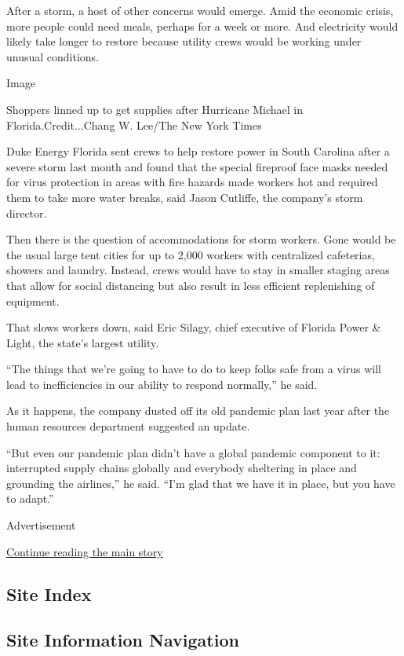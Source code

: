 After a storm, a host of other concerns would emerge. Amid the economic
crisis, more people could need meals, perhaps for a week or more. And
electricity would likely take longer to restore because utility crews
would be working under unusual conditions.

Image

Shoppers linned up to get supplies after Hurricane Michael in
Florida.Credit...Chang W. Lee/The New York Times

Duke Energy Florida sent crews to help restore power in South Carolina
after a severe storm last month and found that the special fireproof
face masks needed for virus protection in areas with fire hazards made
workers hot and required them to take more water breaks, said Jason
Cutliffe, the company's storm director.

Then there is the question of accommodations for storm workers. Gone
would be the usual large tent cities for up to 2,000 workers with
centralized cafeterias, showers and laundry. Instead, crews would have
to stay in smaller staging areas that allow for social distancing but
also result in less efficient replenishing of equipment.

That slows workers down, said Eric Silagy, chief executive of Florida
Power \& Light, the state's largest utility.

``The things that we're going to have to do to keep folks safe from a
virus will lead to inefficiencies in our ability to respond normally,''
he said.

As it happens, the company dusted off its old pandemic plan last year
after the human resources department suggested an update.

``But even our pandemic plan didn't have a global pandemic component to
it: interrupted supply chains globally and everybody sheltering in place
and grounding the airlines,'' he said. ``I'm glad that we have it in
place, but you have to adapt.''

Advertisement

\protect\hyperlink{after-bottom}{Continue reading the main story}

\hypertarget{site-index}{%
\subsection{Site Index}\label{site-index}}

\hypertarget{site-information-navigation}{%
\subsection{Site Information
Navigation}\label{site-information-navigation}}


